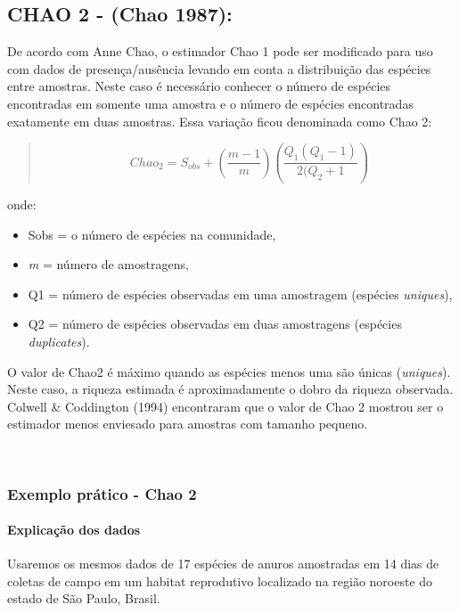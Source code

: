 \documentclass[
]{book}
\begin{document}
\hypertarget{chao-2---chao-1987}{%
\subsection{CHAO 2 - (Chao 1987):}\label{chao-2---chao-1987}}

De acordo com Anne Chao, o estimador Chao 1 pode ser modificado para uso com dados de presença/ausência levando em conta a distribuição das espécies entre amostras. Neste caso é
necessário conhecer o número de espécies encontradas em somente uma amostra e o
número de espécies encontradas exatamente em duas amostras. Essa variação ficou denominada como
Chao 2:

\begin{quote}
\[Chao_{2} = S_{obs} + \left(\frac{m-1}{m}\right)\left(\frac{Q_1(Q_1-1)}{2(Q_2 + 1}\right)\]
\end{quote}

onde:

\begin{itemize}
\item
  Sobs = o número de espécies na comunidade,
\item
  \emph{m} = número de amostragens,
\item
  Q1 = número de espécies observadas em uma amostragem (espécies \emph{uniques}),
\item
  Q2 = número de espécies observadas em duas amostragens (espécies \emph{duplicates}).
\end{itemize}

O valor de Chao2 é máximo quando as espécies menos uma são únicas (\emph{uniques}). Neste caso, a riqueza estimada é aproximadamente o dobro da riqueza observada. Colwell \& Coddington (1994) encontraram que o valor de Chao 2 mostrou ser o estimador menos enviesado para amostras com tamanho pequeno.

~

\hypertarget{exemplo-pruxe1tico---chao-2}{%
\subsubsection{Exemplo prático - Chao 2}\label{exemplo-pruxe1tico---chao-2}}

\hypertarget{explicauxe7uxe3o-dos-dados-2}{%
\paragraph{Explicação dos dados}\label{explicauxe7uxe3o-dos-dados-2}}

Usaremos os mesmos dados de 17 espécies de anuros amostradas em 14 dias de coletas de campo em um habitat reprodutivo localizado na região noroeste do estado de São Paulo, Brasil.
\end{document}
